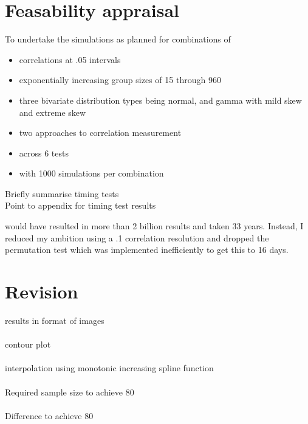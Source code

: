 \section{Feasability appraisal}
To undertake the simulations as planned for combinations of 
\begin{itemize}
  \item correlations at .05 intervals 
  \item exponentially increasing group sizes of 15 through 960
  \item three bivariate distribution types being normal, and gamma with mild skew and extreme skew
  \item two approaches to correlation measurement 
  \item across 6 tests
  \item with 1000 simulations per combination 
\end{itemize}

Briefly summarise timing tests
\\
Point to appendix for timing test results

would have resulted in more than 2 billion results and taken 33 years.  Instead, I reduced my ambition using a .1 correlation resolution and dropped the permutation test which was implemented inefficiently to get this to 16 days.

\section{Revision}
  
results in format of images
\\
\\
contour plot
\\
\\  
interpolation using monotonic increasing spline function
\\
\\
Required sample size to achieve 80%
\\
\\  
Difference to achieve 80%

